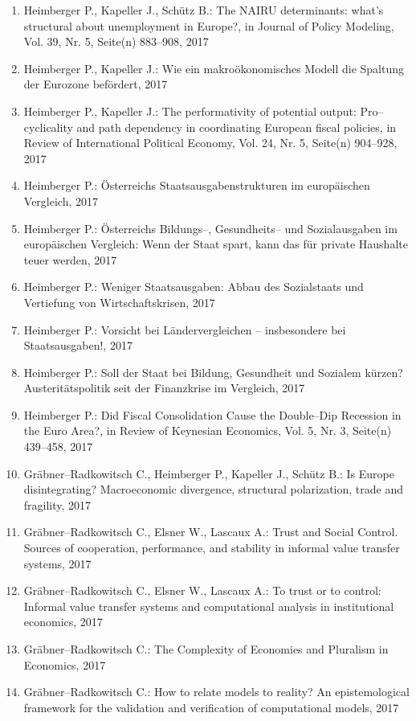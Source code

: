 \begin{enumerate}
	 \item Heimberger P., Kapeller J., Schütz B.: The NAIRU determinants: what’s structural about unemployment in Europe?, in Journal of Policy Modeling, Vol. 39, Nr. 5, Seite(n) 883--908, 2017
	 \item Heimberger P., Kapeller J.: Wie ein makroökonomisches Modell die Spaltung der Eurozone befördert, 2017
	 \item Heimberger P., Kapeller J.: The performativity of potential output: Pro--cyclicality and path dependency in coordinating European fiscal policies, in Review of International Political Economy, Vol. 24, Nr. 5, Seite(n) 904--928, 2017
	 \item Heimberger P.: Österreichs Staatsausgabenstrukturen im europäischen Vergleich, 2017
	 \item Heimberger P.: Österreichs Bildungs--, Gesundheits-- und Sozialausgaben im europäischen Vergleich: Wenn der Staat spart, kann das für private Haushalte teuer werden, 2017
	 \item Heimberger P.: Weniger Staatsausgaben: Abbau des Sozialstaats und Vertiefung von Wirtschaftskrisen, 2017
	 \item Heimberger P.: Vorsicht bei Ländervergleichen – insbesondere bei Staatsausgaben!, 2017
	 \item Heimberger P.: Soll der Staat bei Bildung, Gesundheit und Sozialem kürzen? Austeritätspolitik seit der Finanzkrise im Vergleich, 2017
	 \item Heimberger P.: Did Fiscal Consolidation Cause the Double--Dip Recession in the Euro Area?, in Review of Keynesian Economics, Vol. 5, Nr. 3, Seite(n) 439--458, 2017
	 \item Gräbner--Radkowitsch C., Heimberger P., Kapeller J., Schütz B.: Is Europe disintegrating? Macroeconomic divergence, structural polarization, trade and fragility, 2017
	 \item Gräbner--Radkowitsch C., Elsner W., Lascaux A.: Trust and Social Control. Sources of cooperation, performance, and stability in informal value transfer systems, 2017
	 \item Gräbner--Radkowitsch C., Elsner W., Lascaux A.: To trust or to control: Informal value transfer systems and computational analysis in institutional economics, 2017
	 \item Gräbner--Radkowitsch C.: The Complexity of Economies and Pluralism in Economics, 2017
	 \item Gräbner--Radkowitsch C.: How to relate models to reality? An epistemological framework for the validation and verification of computational models, 2017

\end{enumerate}
